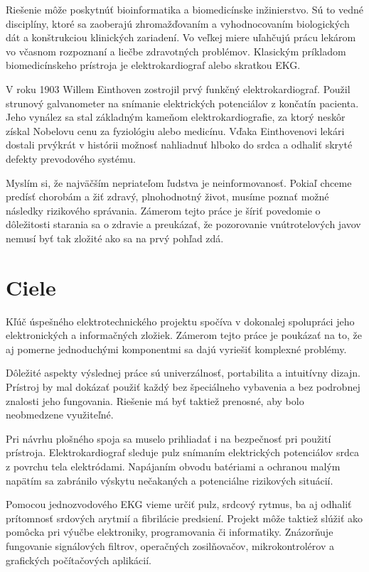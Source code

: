 \documentclass[titlepage,12pt]{article}
\begin{document}
Riešenie môže poskytnúť bioinformatika a biomedicínske inžinierstvo. Sú to vedné disciplíny, ktoré sa zaoberajú zhromažďovaním a vyhodnocovaním biologických dát a konštrukciou klinických zariadení. Vo veľkej miere uľahčujú prácu lekárom vo včasnom rozpoznaní a liečbe zdravotných problémov. Klasickým príkladom biomedicínskeho prístroja je elektrokardiograf alebo skratkou EKG. 

V roku 1903 Willem Einthoven zostrojil prvý funkčný elektrokardiograf. Použil strunový galvanometer na snímanie elektrických potenciálov z končatín pacienta. Jeho vynález sa stal základným kameňom elektrokardiografie, za ktorý neskôr získal Nobelovu cenu za fyziológiu alebo medicínu. Vďaka Einthovenovi lekári dostali prvýkrát v histórii možnosť nahliadnuť hlboko do srdca a odhaliť skryté defekty prevodového systému.

Myslím si, že najväčším nepriateľom ľudstva je neinformovanosť. Pokiaľ chceme predísť chorobám a žiť zdravý, plnohodnotný život, musíme poznať možné následky rizikového správania. Zámerom tejto práce je šíriť povedomie o dôležitosti starania sa o zdravie a preukázať, že pozorovanie vnútrotelových javov nemusí byť tak zložité ako sa na prvý pohľad zdá. 



\newpage
\section{Ciele}
Kľúč úspešného elektrotechnického projektu spočíva v dokonalej spolupráci jeho elektronických a informačných zložiek. Zámerom tejto práce je poukázať na to, že aj pomerne jednoduchými komponentmi sa dajú vyriešiť komplexné problémy. 

Dôležité aspekty výslednej práce sú univerzálnosť, portabilita a intuitívny dizajn. Prístroj by mal dokázať použiť každý bez špeciálneho vybavenia a bez podrobnej znalosti jeho fungovania. Riešenie má byť taktiež prenosné, aby bolo neobmedzene využiteľné.

Pri návrhu plošného spoja sa muselo prihliadať i na bezpečnosť pri použití prístroja. Elektrokardiograf sleduje pulz snímaním elektrických potenciálov srdca z povrchu tela elektródami. Napájaním obvodu batériami a ochranou malým napätím sa zabránilo výskytu nečakaných a potenciálne rizikových situácií.

Pomocou jednozvodového EKG vieme určiť pulz, srdcový rytmus, ba aj odhaliť prítomnosť srdových arytmií a fibrilácie predsiení. Projekt môže taktiež slúžiť ako pomôcka pri výučbe elektroniky, programovania či informatiky. Znázorňuje fungovanie signálových filtrov, operačných zosilňovačov, mikrokontrolérov a grafických počítačových aplikácií.
\end{document}
